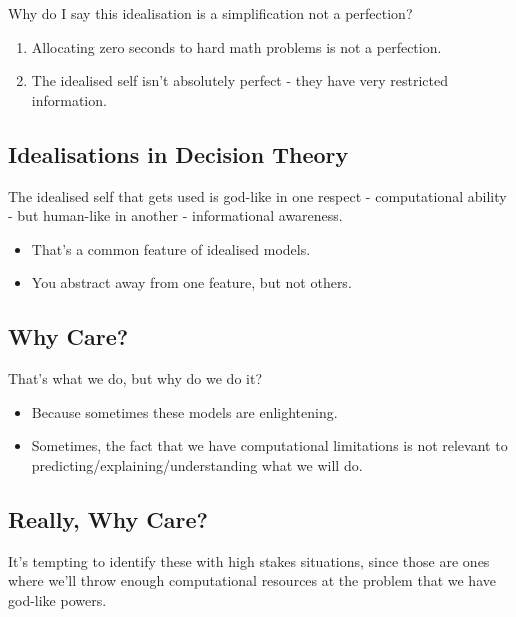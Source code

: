 \documentclass[
  11pt,
  letterpaper,
  DIV=11,
  numbers=noendperiod,
  oneside]{scrartcl}
\providecommand{\tightlist}{%
  \setlength{\itemsep}{0pt}\setlength{\parskip}{0pt}}\usepackage{longtable,booktabs,array}
\begin{document}
Why do I say this idealisation is a simplification not a perfection?

\begin{enumerate}
\def\labelenumi{\arabic{enumi}.}
\tightlist
\item
  Allocating zero seconds to hard math problems is not a perfection.
\item
  The idealised self isn't absolutely perfect - they have very
  restricted information.
\end{enumerate}

\subsection{Idealisations in Decision
Theory}\label{idealisations-in-decision-theory-2}

The idealised self that gets used is god-like in one respect -
computational ability - but human-like in another - informational
awareness.

\begin{itemize}
\tightlist
\item
  That's a common feature of idealised models.
\item
  You abstract away from one feature, but not others.
\end{itemize}

\subsection{Why Care?}\label{why-care}

That's what we do, but why do we do it?

\begin{itemize}
\tightlist
\item
  Because sometimes these models are enlightening.
\item
  Sometimes, the fact that we have computational limitations is not
  relevant to predicting/explaining/understanding what we will do.
\end{itemize}

\subsection{Really, Why Care?}\label{really-why-care}

It's tempting to identify these with high stakes situations, since those
are ones where we'll throw enough computational resources at the problem
that we have god-like powers.
\end{document}
